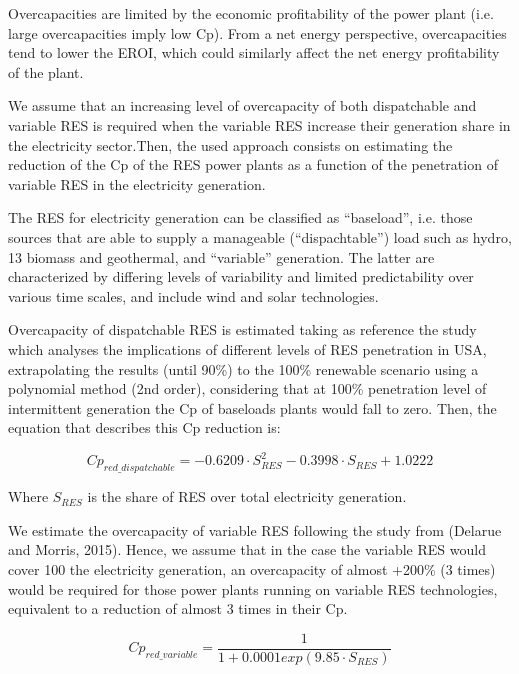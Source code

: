 Overcapacities are limited by the economic profitability of the power plant (i.e. large overcapacities imply low Cp). From a net energy perspective, overcapacities tend to lower the EROI, which could  similarly affect the net energy profitability of the plant.

We assume that an increasing level of overcapacity of both dispatchable and variable RES is required when the variable RES increase their generation share in the electricity sector.Then, the used approach consists on estimating the reduction of the Cp of the RES power plants as a function of the penetration of variable RES in the electricity generation.

The RES for electricity generation can be classified as “baseload”, i.e. those sources that are able to supply a manageable (“dispachtable”) load such as hydro, 13 biomass and geothermal, and “variable” generation. The latter are characterized by differing levels of variability and limited predictability over various time scales, and include wind and solar technologies.

Overcapacity of dispatchable RES is estimated taking as reference the study \cite{NREL2012} which analyses the implications of different levels of RES penetration in USA, extrapolating the results (until 90\%) to the 100\% renewable scenario using a polynomial method (2nd order), considering that at 100\% penetration level of intermittent generation the Cp of baseloads plants would fall to zero. Then, the equation that describes this Cp reduction is:

\begin{equation}
    Cp_{red\_dispatchable}=-0.6209 \cdot S_{RES}^2-0.3998 \cdot S_{RES} + 1.0222
    \label{eq:cp-reduction-dispatchable}
\end{equation}

Where $S_{RES}$ is the share of RES over total electricity generation. 

We estimate the overcapacity of variable RES following the study from (Delarue and Morris, 2015). Hence, we assume that in the case the variable RES would cover 100%
the electricity generation, an overcapacity of almost +200\% (3 times) would be required for those
power plants running on variable RES technologies, equivalent to a reduction of almost 3 times in
their Cp.

\begin{equation}
    Cp_{red\_variable}= \frac {1} {1+0.0001exp(9.85 \cdot S_{RES})}
    \label{eq:cp-reduction-variable}
\end{equation}

